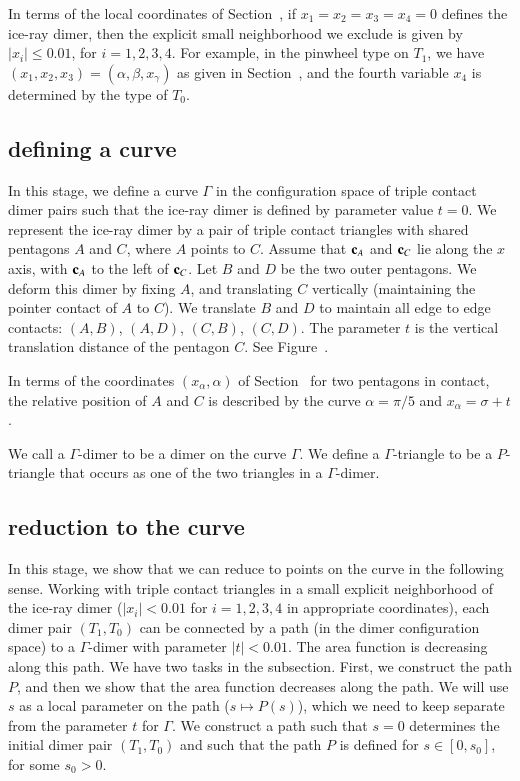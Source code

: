 In terms of the local coordinates of Section~, if
$x_1=x_2=x_3=x_4=0$ defines the ice-ray dimer, then the explicit small
neighborhood we exclude is given by $|x_i|\le 0.01$, for $i=1,2,3,4$.
For example, in the pinwheel type on $T_1$, we have
$(x_1,x_2,x_3)=(\alpha,\beta,x_\gamma)$ as given in
Section~, and the fourth variable $x_4$ is determined by
the type of $T_0$.

\subsection{defining a curve}\label{sec:gamma}

In this stage, we define a curve $\Gamma$ in the configuration space
of triple contact dimer pairs such that the ice-ray dimer is defined
by parameter value $t=0$.  We represent the ice-ray dimer by a pair of
triple contact triangles with shared pentagons $A$ and $C$, where $A$
points to $C$.  Assume that ${\mathbf c}_A$ and ${\mathbf c}_C$ lie along the $x$ axis,
with ${\mathbf c}_A$ to the left of ${\mathbf c}_C$.  Let $B$ and $D$ be the two outer
pentagons.  We deform this dimer by fixing $A$, and translating $C$
vertically (maintaining the pointer contact of $A$ to $C$).  We
translate $B$ and $D$ to maintain all edge to edge contacts: $(A,B)$,
$(A,D)$, $(C,B)$, $(C,D)$.  The parameter $t$ is the vertical
translation distance of the pentagon $C$.  See
Figure~.


In terms of the coordinates $(x_\alpha,\alpha)$ of
Section~ for two pentagons in contact, the relative
position of $A$ and $C$ is described by the curve $\alpha=\pi/5$ and
$x_\alpha = \sigma+t$.

We call a $\Gamma$-dimer to be a dimer on the curve $\Gamma$.  We
define a $\Gamma$-triangle to be a $P$-triangle that occurs as one of
the two triangles in a $\Gamma$-dimer.


\subsection{reduction to the curve}

In this stage, we show that we can reduce to points on the curve in
the following sense.  Working with triple contact triangles in a small
explicit neighborhood of the ice-ray dimer ($|x_i|<0.01$ for
$i=1,2,3,4$ in appropriate coordinates), each dimer pair $(T_1,T_0)$
can be connected by a path (in the dimer configuration space) to a
$\Gamma$-dimer with parameter $|t|<0.01$.  The area function is
decreasing along this path.  We have two tasks in the subsection.
First, we construct the path $P$, and then we show that the area
function decreases along the path.  We will use $s$ as a local
parameter on the path ($s\mapsto P(s)$), which we need to keep
separate from the parameter $t$ for $\Gamma$.  We construct a path
such that $s=0$ determines the initial dimer pair $(T_1,T_0)$ and such
that the path $P$ is defined for $s\in [0,s_0]$, for some $s_0>0$.


